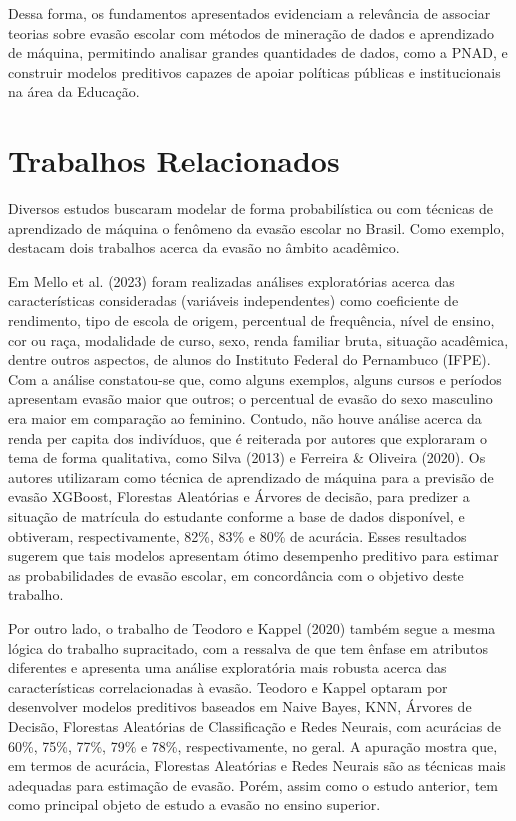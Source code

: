 \documentclass[english, spanish, brazilian]{RBIEarticle} %
\begin{document}
Dessa forma, os fundamentos apresentados evidenciam a relevância de associar teorias sobre evasão escolar com métodos de mineração de dados e aprendizado de máquina, permitindo analisar grandes quantidades de dados, como a PNAD, e construir modelos preditivos capazes de apoiar políticas públicas e institucionais na área da Educação.

\section{Trabalhos Relacionados}
Diversos estudos buscaram modelar de forma probabilística ou com técnicas de aprendizado de máquina o fenômeno da evasão escolar no Brasil. Como exemplo, destacam dois trabalhos acerca da evasão no âmbito acadêmico.

Em Mello et al. (2023) foram realizadas análises exploratórias acerca das características consideradas (variáveis independentes) como coeficiente de rendimento, tipo de escola de origem, percentual de frequência, nível de ensino, cor ou raça, modalidade de curso, sexo, renda familiar bruta, situação acadêmica, dentre outros aspectos, de alunos do Instituto Federal do Pernambuco (IFPE). Com a análise constatou-se que, como alguns exemplos, alguns cursos e períodos apresentam evasão maior que outros; o percentual de evasão do sexo masculino era maior em comparação ao feminino. Contudo, não houve análise acerca da renda per capita dos indivíduos, que é reiterada por autores que exploraram o tema de forma qualitativa, como Silva (2013) e Ferreira \& Oliveira (2020). Os autores utilizaram como técnica de aprendizado de máquina para a previsão de evasão XGBoost, Florestas Aleatórias e Árvores de decisão, para predizer a situação de matrícula do estudante conforme a base de dados disponível, e obtiveram, respectivamente, 82\%, 83\% e 80\% de acurácia. Esses resultados sugerem que tais modelos apresentam ótimo desempenho preditivo para estimar as probabilidades de evasão escolar, em concordância com o objetivo deste trabalho.

Por outro lado, o trabalho de Teodoro e Kappel (2020) também segue a mesma lógica do trabalho supracitado, com a ressalva de que tem ênfase em atributos diferentes e apresenta uma análise exploratória mais robusta acerca das características correlacionadas à evasão. Teodoro e Kappel optaram por desenvolver modelos preditivos baseados em Naive Bayes, KNN, Árvores de Decisão, Florestas Aleatórias de Classificação e Redes Neurais, com acurácias de 60\%, 75\%, 77\%, 79\% e 78\%, respectivamente, no geral. A apuração mostra que, em termos de acurácia, Florestas Aleatórias e Redes Neurais são as técnicas mais adequadas para estimação de evasão. Porém, assim como o estudo anterior, tem como principal objeto de estudo a evasão no ensino superior.  
\end{document}
